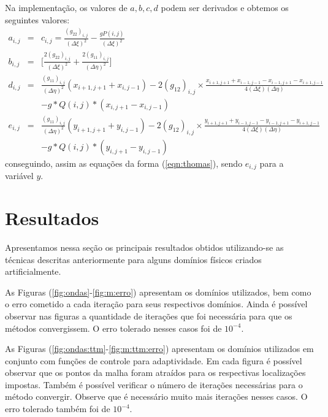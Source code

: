 \documentclass{article}
\begin{document}
			Na implementação, os valores de $a,b,c,d$ podem ser derivados e obtemos os seguintes valores:
			\begin{eqnarray*}
				a_{i,j} &=& c_{i,j}  = \frac{(g_{22})_{i,j}}{(\Delta\xi)^2} - \frac{g P(i,j)}{(\Delta\xi)^2}\\
				b_{i,j} &=& \Bigg[ \frac{2(g_{22})_{i,j}}{(\Delta\xi)^2} + \frac{2(g_{11})_{i,j}}{(\Delta\eta)^2}\Bigg]\\
				d_{i,j} &=& \frac{(g_{11})_{i,j}}{(\Delta\eta)^2}(x_{i+1,j+1} + x_{i,j-1}) - 2(g_{12})_{i,j}\times\frac{x_{i+1,j+1} +x_{i-1,j-1} - x_{i-1,j+1} - x_{i+1,j-1}}{4(\Delta\xi)(\Delta\eta)} \\
					&&- g*Q(i,j)*(x_{i,j+1}-x_{i,j-1})\\
				e_{i,j} &=& \frac{(g_{11})_{i,j}}{(\Delta\eta)^2}(y_{i+1,j+1} + y_{i,j-1})- 2(g_{12})_{i,j}\times\frac{y_{i+1,j+1} +y_{i-1,j-1} - y_{i-1,j+1} - y_{i+1,j-1}}{4(\Delta\xi)(\Delta\eta)} \\
					&&- g*Q(i,j)*(y_{i,j+1}-y_{i,j-1})
			\end{eqnarray*}
			conseguindo, assim as equações da forma (\ref{eqn:thomas}), sendo $e_{i,j}$ para a variável $y$.

	\section{Resultados} %
	\label{sec:resultados}
		Apresentamos nessa seção os principais resultados obtidos utilizando-se as técnicas descritas anteriormente para alguns domínios físicos criados artificialmente.
		
		As Figuras (\ref{fig:ondas}-\ref{fig:m:erro}) apresentam os domínios utilizados, bem como o erro cometido a cada iteração para seus respectivos domínios. Ainda é possível observar nas figuras a quantidade de iterações que foi necessária para que os métodos convergissem. O erro tolerado nesses casos foi de $10^{-4}$.

		As Figuras (\ref{fig:ondas:ttm}-\ref{fig:m:ttm:erro}) apresentam os domínios utilizados em conjunto com funções de controle para adaptividade. Em cada figura é possível observar que os pontos da malha foram atraídos para os respectivas localizações impostas. Também é possível verificar o número de iterações necessárias para o método convergir. Observe que é necessário muito mais iterações nesses casos. O erro tolerado também foi de $10^{-4}$.
\end{document}
